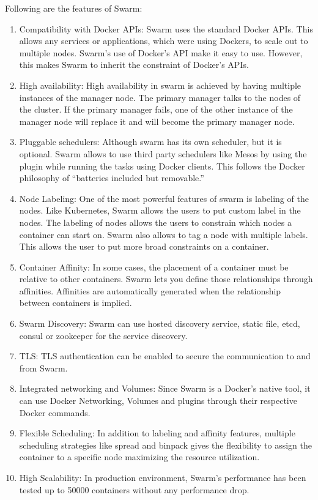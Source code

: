 Following are the features of Swarm:
\begin{enumerate}
\item Compatibility with Docker APIs:
Swarm uses the standard Docker APIs. This allows any services or applications, which were using Dockers, to scale out to multiple nodes. Swarm’s use of Docker’s API make it easy to use. However, this makes Swarm to inherit the constraint of Docker’s APIs. 

\item High availability:
High availability in swarm is achieved by having multiple instances of the manager node. The primary manager talks to the nodes of the cluster. If the primary manager fails, one of the other instance of the manager node will replace it and will become the primary manager node.

\item Pluggable schedulers:
Although swarm has its own scheduler, but it is optional. Swarm allows to use third party schedulers like Mesos by using the plugin while running the tasks using Docker clients.  This follows the Docker philosophy of “batteries included but removable.”

\item Node Labeling:
One of the most powerful features of swarm is labeling of the nodes. Like Kubernetes, Swarm allows the users to put custom label in the nodes. The labeling of nodes allows the users to constrain which nodes a container can start on. Swarm also allows to tag a node with multiple labels. This allows the user to put more broad constraints on a container.

\item Container Affinity:
In some cases, the placement of a container must be relative to other containers. Swarm lets you define those relationships through affinities. Affinities are automatically generated when the relationship between containers is implied.

\item Swarm Discovery:
Swarm can use hosted discovery service, static file, etcd, consul or zookeeper for the service discovery.

\item TLS:
TLS authentication can be enabled to secure the communication to and from Swarm.

\item Integrated networking and Volumes:
Since Swarm is a Docker’s native tool, it can use Docker Networking, Volumes and plugins through their respective Docker commands.


\item Flexible Scheduling:
In addition to labeling and affinity features, multiple scheduling strategies like spread and binpack gives the flexibility to assign the container to a specific node maximizing the resource utilization.


\item High Scalability:
In production environment, Swarm’s performance has been tested up to 50000 containers without any performance drop. 

\end{enumerate}